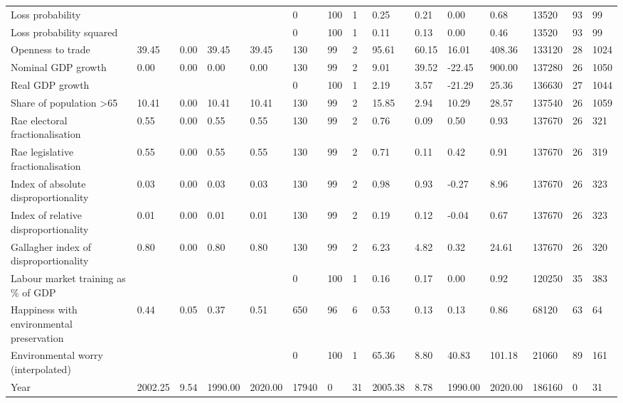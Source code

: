 \begin{longtable}{lllllllllllllll}
Loss probability &  &  &  &  & 0 & 100 & 1 & 0.25 & 0.21 & 0.00 & 0.68 & 13520 & 93 & 99\\
\addlinespace
Loss probability squared &  &  &  &  & 0 & 100 & 1 & 0.11 & 0.13 & 0.00 & 0.46 & 13520 & 93 & 99\\
Openness to trade & 39.45 & 0.00 & 39.45 & 39.45 & 130 & 99 & 2 & 95.61 & 60.15 & 16.01 & 408.36 & 133120 & 28 & 1024\\
Nominal GDP growth & 0.00 & 0.00 & 0.00 & 0.00 & 130 & 99 & 2 & 9.01 & 39.52 & -22.45 & 900.00 & 137280 & 26 & 1050\\
Real GDP growth &  &  &  &  & 0 & 100 & 1 & 2.19 & 3.57 & -21.29 & 25.36 & 136630 & 27 & 1044\\
Share of population >65 & 10.41 & 0.00 & 10.41 & 10.41 & 130 & 99 & 2 & 15.85 & 2.94 & 10.29 & 28.57 & 137540 & 26 & 1059\\
\addlinespace
Rae electoral fractionalisation & 0.55 & 0.00 & 0.55 & 0.55 & 130 & 99 & 2 & 0.76 & 0.09 & 0.50 & 0.93 & 137670 & 26 & 321\\
Rae legislative fractionalisation & 0.55 & 0.00 & 0.55 & 0.55 & 130 & 99 & 2 & 0.71 & 0.11 & 0.42 & 0.91 & 137670 & 26 & 319\\
Index of absolute disproportionality & 0.03 & 0.00 & 0.03 & 0.03 & 130 & 99 & 2 & 0.98 & 0.93 & -0.27 & 8.96 & 137670 & 26 & 323\\
Index of relative disproportionality & 0.01 & 0.00 & 0.01 & 0.01 & 130 & 99 & 2 & 0.19 & 0.12 & -0.04 & 0.67 & 137670 & 26 & 323\\
Gallagher index of disproportionality & 0.80 & 0.00 & 0.80 & 0.80 & 130 & 99 & 2 & 6.23 & 4.82 & 0.32 & 24.61 & 137670 & 26 & 320\\
\addlinespace
Labour market training as \% of GDP &  &  &  &  & 0 & 100 & 1 & 0.16 & 0.17 & 0.00 & 0.92 & 120250 & 35 & 383\\
Happiness with environmental preservation & 0.44 & 0.05 & 0.37 & 0.51 & 650 & 96 & 6 & 0.53 & 0.13 & 0.13 & 0.86 & 68120 & 63 & 64\\
Environmental worry (interpolated) &  &  &  &  & 0 & 100 & 1 & 65.36 & 8.80 & 40.83 & 101.18 & 21060 & 89 & 161\\
Year & 2002.25 & 9.54 & 1990.00 & 2020.00 & 17940 & 0 & 31 & 2005.38 & 8.78 & 1990.00 & 2020.00 & 186160 & 0 & 31\\
\bottomrule
\end{longtable}
